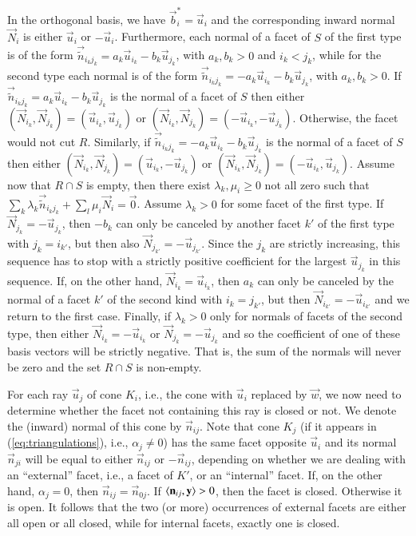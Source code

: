 In the orthogonal basis, we have $\vec b_i^* = \vec u_i$
and the corresponding inward normal $\vec N_i$ is either
$\vec u_i$ or $-\vec u_i$.
Furthermore, each normal of a facet of $S$ of the first type is of the
form $\vec {\tilde n}_{i_kj_k} = a_k \vec u_{i_k} - b_k \vec u_{j_k}$, with 
$a_k, b_k > 0$ and ${i_k} < {j_k}$,
while for the second type each normal is of the form
$\vec {\tilde n}_{i_kj_k} = -a_k \vec u_{i_k} - b_k \vec u_{j_k}$, with 
$a_k, b_k > 0$.
If $\vec {\tilde n}_{i_kj_k} = a_k \vec u_{i_k} - b_k \vec u_{j_k}$
is the normal of a facet of $S$
then either
$(\vec N_{i_k}, \vec N_{j_k}) = (\vec u_{i_k}, \vec u_{j_k})$
or
$(\vec N_{i_k}, \vec N_{j_k}) = (-\vec u_{i_k}, -\vec u_{j_k})$.
Otherwise, the facet would not cut $R$.
Similarly,
if $\vec {\tilde n}_{i_kj_k} = -a_k \vec u_{i_k} - b_k \vec u_{j_k}$
is the normal of a facet of $S$
then either
$(\vec N_{i_k}, \vec N_{j_k}) = (\vec u_{i_k}, -\vec u_{j_k})$
or
$(\vec N_{i_k}, \vec N_{j_k}) = (-\vec u_{i_k}, \vec u_{j_k})$.
Assume now that $R \cap S$ is empty, then there exist
$\lambda_k, \mu_i \ge 0$ not all zero
such that
$\sum_k \lambda_k \vec {\tilde n}_{i_kj_k} + \sum_l \mu_i \vec N_i = \vec 0$.
Assume $\lambda_k > 0$ for some facet of the first type.
If $\vec N_{j_k} = -\vec u_{j_k}$, then $-b_k$ can only be canceled
by another facet $k'$ of the first type with $j_k = i_{k'}$, but then
also $\vec N_{j_{k'}} = -\vec u_{j_{k'}}$.  Since the $j_k$ are strictly
increasing, this sequence has to stop with a strictly positive coefficient
for the largest $\vec u_{j_k}$ in this sequence.
If, on the other hand, $\vec N_{i_k} = \vec u_{i_k}$, then $a_k$ can only
be canceled by the normal of a facet $k'$ of the second kind
with $i_k = j_{k'}$, but then
$\vec N_{i_{k'}} = -\vec u_{i_{k'}}$ and we return to the first case.
Finally, if $\lambda_k > 0$ only for normals of facets of the second type,
then either $\vec N_{i_k} = -\vec u_{i_k}$ or $\vec N_{j_k} = -\vec u_{j_k}$
and so the coefficient of one of these basis vectors will be strictly
negative.
That is, the sum of the normals will never be zero and
the set $R \cap S$ is non-empty.

For each ray $\vec u_j$ of cone $K_i$, i.e., the cone with $\vec u_i$ replaced
by $\vec w$, we now need to determine whether the facet not containing this
ray is closed or not.  We denote the (inward) normal of this cone by
$\vec n_{ij}$.  Note that cone $K_j$ (if it appears in (\ref{eq:triangulations}),
i.e., $\alpha_j \ne 0$) has the same facet opposite $\vec u_i$
and its normal $\vec n_{ji}$ will be equal to either $\vec n_{ij}$ or
$-\vec n_{ij}$, depending on whether we are dealing with an ``external'' facet,
i.e., a facet of $K'$, or an ``internal'' facet.
If, on the other hand, $\alpha_j = 0$, then $\vec n_{ij} = \vec n_{0j}$.
If $\sp{n_{ij}}y > 0$, then the facet is closed.
Otherwise it is open.
It follows that the two (or more) occurrences of external facets are either all open
or all closed, while for internal facets, exactly one is closed.

